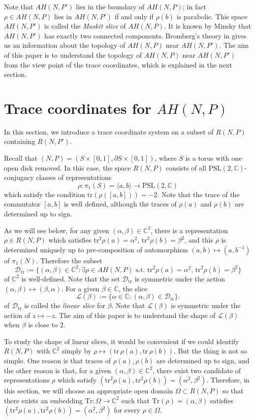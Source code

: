 \documentclass[12pt]{article}
\theoremstyle{plain}
\theoremstyle{definition}
\theoremstyle{remark}
\newcommand{\C}{\mathbb C}
\newcommand{\D}{\mathcal D}
\newcommand{\LL}{\mathcal L}
\newcommand{\alp}{\alpha}
\newcommand{\bd}{\partial}
\newcommand{\la}{\langle}
\newcommand{\ra}{\rangle}
\newcommand{\tr}{{\mathrm{tr}}}
\newcommand{\Tr}{{\mathrm{Tr}}}
\newcommand{\psl}{{\mathrm{PSL}}(2,\mathbb C)}
\begin{document}
Note that $AH(N,P')$ lies in the boundary of $AH(N,P)$; in fact  
$\rho \in AH(N,P)$ lies in $AH(N,P')$ 
if and only if $\rho(b)$ is parabolic.  
This space $AH(N,P')$ is called the {\it Maskit slice} of $AH(N,P)$.  
It is known by Minsky \cite{Mi} that $AH(N,P')$ has exactly two connected components. 
Bromberg's theory in \cite{Br} gives us an information about the topology of $AH(N,P)$ near $AH(N,P')$. 
The aim of this paper is to understand the topology of $AH(N,P)$ near $AH(N,P')$ 
from the view point of the trace coordinates, which is explained in the next section. 


\section{Trace coordinates for $AH(N,P)$}

In this section, we introduce a trace coordinate system 
on a subset of $R(N,P)$ containing $R(N,P')$.   

Recall that $(N,P)=(S \times [0,1],\bd S \times [0,1])$, 
where $S$ is a torus with one open disk removed.   
In this case,  the space $R(N,P)$ 
consists of all $\psl$-conjugacy classes of representations 
$$
\rho: \pi_1(S)=\la a,b \ra \to \psl
$$
which satisfy the condition $\tr (\rho([a,b]))=-2$. 
Note that the trace of the commutator $[a,b]$ is well defined, 
although the traces of $\rho(a)$ and $\rho(b)$ are determined up to sign. 

As we will see below, for any given $(\alp,\beta) \in \C^2$,  
there is  a representation $\rho \in R(N,P)$ which satisfies 
 $\tr^2\rho(a)=\alp^2, \, \tr^2\rho(b)=\beta^2$,  and this $\rho$ is  determined 
uniquely up to pre-composition of automorphism $(a,b) \mapsto (a,b^{-1})$ of $\pi_1(N)$. 
Therefore the subset  
$$
\D_{\tr}:=\{(\alp,\beta) \in \C^2 : \exists \rho  \in AH(N,P) 
\text{ s.t. } \tr^2\rho(a)=\alp^2, \, \tr^2\rho(b)=\beta^2\}
$$ 
of $\C^2$ is well-defined. 
Note that the set $\D_\tr$ is symmetric under the action $(\alp,\beta) \mapsto (\beta,\alp)$. 
For  a given $\beta \in \C$, the slice 
$$
\LL(\beta):=\{\alp \in \C :  (\alp,\beta) \in \D_{\tr}\}.
$$
of $\D_\tr$ is called the {\it linear slice} for $\beta$. 
Note that $\LL(\beta)$ is symmetric under the action of $z \mapsto -z$. 
The aim of this paper is  to understand the shape of $\LL(\beta)$ when $\beta$ is close to $2$. 

To study the shape of linear slices,  
it would be convenient  if we could identify $R(N,P)$ with $\C^2$ simply 
 by $\rho \mapsto (\tr\,\rho(a), \tr\,\rho(b))$. 
But the thing is not so simple. 
One reason is  that traces of $\rho(a), \rho(b)$ are determined up to sign, 
and the other reason is that, for a given $(\alp,\beta) \in \C^2$, 
there exist two candidate of representations $\rho$ which satisfy
$(\tr^2 \rho(a), \tr^2 \rho(b))=(\alp^2,\beta^2)$. 
Therefore, in this section, we will choose  an appropriate open domain $\Omega \subset R(N,P)$ 
so that there exists an embedding 
$\Tr:\Omega \to \C^2$  such that $\Tr(\rho)=(\alp,\beta)$ satisfies 
$(\tr^2 \rho(a), \tr^2 \rho(b))=(\alp^2,\beta^2)$ for every $\rho \in \Omega$.  
\end{document}
